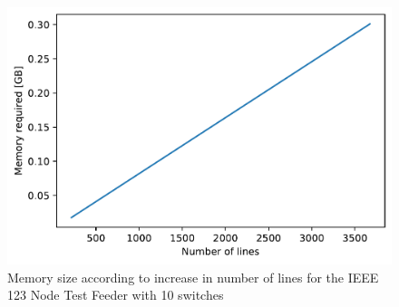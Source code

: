 \begin{figure}
    \centering
    \includegraphics[scale=0.5]{_conclusions/fig/lines.pdf}
    \caption{Memory size according to increase in number of lines for the IEEE 123
    Node Test Feeder with 10 switches}
    \label{ch-conclusions:fig:ms_lines}
\end{figure}